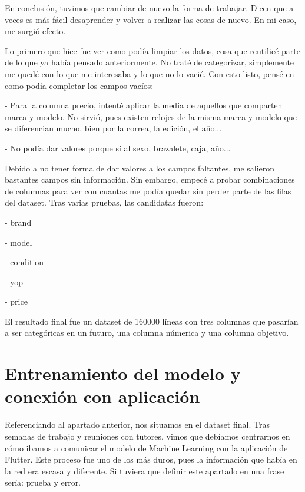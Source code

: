 	En conclusión, tuvimos que cambiar de nuevo la forma de trabajar. Dicen que a veces es más fácil desaprender y volver a realizar las cosas de nuevo. En mi caso, me surgió efecto.
	
		Lo primero que hice fue ver como podía limpiar los datos, cosa que reutilicé parte de lo que ya había pensado anteriormente. No traté de categorizar, simplemente me quedé con lo que me interesaba y lo que no lo vacié. Con esto listo, pensé en como podía completar los campos vacíos: 
		\begin{description}
		\item - Para la columna precio, intenté aplicar la media de aquellos que comparten marca y modelo. No sirvió, pues existen relojes de la misma marca y modelo que se diferencian mucho, bien por la correa, la edición, el año...
		\item - No podía dar valores porque sí al sexo, brazalete, caja, año...
	\end{description}
	Debido a no tener forma de dar valores a los campos faltantes, me salieron bastantes campos sin información. Sin embargo, empecé a probar combinaciones de columnas para ver con cuantas me podía quedar sin perder parte de las filas del dataset. Tras varias pruebas, las candidatas fueron:
		\begin{description}
		\item - brand
		\item - model
		\item - condition
		\item - yop
		\item - price
	\end{description}
	
	El resultado final fue un dataset de 160000 líneas con tres columnas que pasarían a ser categóricas en un futuro, una columna númerica y una columna objetivo.
	
		
\section{Entrenamiento del modelo y conexión con aplicación}

	Referenciando al apartado anterior, nos situamos en el dataset final. Tras semanas de trabajo y reuniones con tutores, vimos que debíamos centrarnos en cómo ibamos a comunicar el modelo de Machine Learning con la aplicación de Flutter. Este proceso fue uno de los más duros, pues la información que había en la red era escasa y diferente. Si tuviera que definir este apartado en una frase sería: prueba y error.
	
